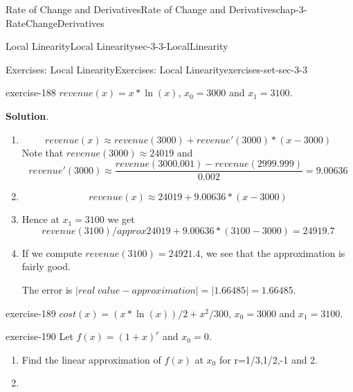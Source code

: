 \documentclass[oneside,10pt,]{book}
\numberwithin{equation}{section}
\begin{document}
\begin{chapterptx}{Rate of Change and Derivatives}{}{Rate of Change and Derivatives}{}{}{chap-3-RateChangeDerivatives}
\begin{sectionptx}{Local Linearity}{}{Local Linearity}{}{}{sec-3-3-LocalLinearity}
\begin{exercises-subsection-numberless}{Exercises: Local Linearity}{}{Exercises: Local Linearity}{}{}{exercises-set-sec-3-3}
\begin{exercisegroup}
\begin{divisionexerciseeg}{9}{}{}{exercise-188}
\hypertarget{p-1188}{}%
\(revenue(x)=x*\ln(x)\), \(x_0=3000\) and \(x_1=3100\).%
\par\smallskip%
\noindent\textbf{Solution}.\hypertarget{solution-93}{}\quad%
\leavevmode%
\begin{enumerate}[label=(\alph*)]
\item\hypertarget{li-375}{}%
\begin{equation*}
revenue(x)\approx revenue(3000)+revenue'(3000)*(x-3000)
\end{equation*}
\hypertarget{p-1189}{}%
Note that \(revenue(3000)\approx 24019\) and%
%
\begin{equation*}
revenue'(3000)\approx \frac{revenue(3000.001)-revenue(2999.999)}{0.002}=  9.00636
\end{equation*}
\item\hypertarget{li-376}{}%
\begin{equation*}
revenue(x)\approx 24019+9.00636*(x-3000)
\end{equation*}
%
\item\hypertarget{li-377}{}\hypertarget{p-1190}{}%
Hence at \(x_1=3100\) we get%
%
\begin{equation*}
revenue(3100)/approx 24019+9.00636*(3100-3000)=24919.7
\end{equation*}
\item\hypertarget{li-378}{}\hypertarget{p-1191}{}%
If we compute \(revenue(3100)=24921.4\), we see that the approximation is fairly good.%
\par
\hypertarget{p-1192}{}%
The error is \(|real\ value-approximation|=|1.66485|= 1.66485\).%
\end{enumerate}
\end{divisionexerciseeg}%
\begin{divisionexerciseeg}{10}{}{}{exercise-189}%
\hypertarget{p-1193}{}%
\(cost(x)=(x*\ln(x))/2+x^2/300\), \(x_0=3000\) and \(x_1=3100\).%
\end{divisionexerciseeg}%
\end{exercisegroup}
\par\medskip\noindent
\begin{divisionexercise}{11}{}{}{exercise-190}%
\hypertarget{p-1194}{}%
Let \(f(x)=(1+x)^r\) and \(x_0=0\).%
\leavevmode%
\begin{enumerate}[label=(\alph*)]
\item\hypertarget{li-379}{}\hypertarget{p-1195}{}%
Find the linear approximation of \(f(x)\) at \(x_0\) for r=1\slash{}3,1\slash{}2,-1 and 2.%
\item\hypertarget{li-380}{}\hypertarget{p-1196}{}%

\end{enumerate}
\end{divisionexercise}
\end{exercises-subsection-numberless}
\end{sectionptx}
\end{chapterptx}
\end{document}
